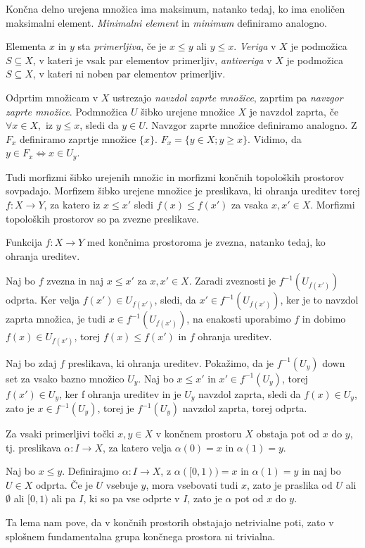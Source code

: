 \documentclass[mat1]{fmfdelo}
\begin{document}
Končna delno urejena množica ima maksimum, natanko tedaj, ko ima enoličen maksimalni element. \textit{Minimalni element} in \textit{minimum} definiramo analogno.

Elementa $x$ in $y$ sta \textit{primerljiva}, če je $x\leq y$ ali $y\leq x$. \textit{Veriga} v $X$ je podmožica $S\subseteq X$, v kateri je vsak par elementov primerljiv, \textit{antiveriga} v $X$ je podmožica $S\subseteq X$, v kateri ni noben par elementov primerljiv. 

Odprtim množicam v $X$ ustrezajo \textit{navzdol zaprte množice}, zaprtim pa \textit{navzgor zaprte množice}. Podmnožica $U$
 šibko urejene množice $X$ je navzdol zaprta, če $\forall x\in X,$ iz $y\leq x$, sledi da $y\in U$. Navzgor zaprte množice definiramo analogno.
Z $F_x$ definiramo zaprtje množice $\{x\}$. $F_x=\{y\in X; y\geq x\}$. Vidimo, da $y\in F_x \Leftrightarrow x\in U_y$.

Tudi morfizmi šibko urejenih množic in morfizmi končnih topoloških prostorov sovpadajo.
  Morfizem šibko urejene množice je preslikava, ki ohranja ureditev torej $f: X\rightarrow Y$, 
  za katero iz $x\leq x'$ sledi $f(x)\leq f(x')$ za vsaka $x,x'\in X$. Morfizmi topoloških prostorov so pa zvezne preslikave.

\begin{trditev}
Funkcija $f:X\rightarrow Y$ med končnima prostoroma je zvezna, natanko tedaj, ko ohranja ureditev.
\end{trditev}

\begin{dokaz}
    Naj bo $f$ zvezna in naj $x\leq x'$ za $x, x' \in X$. Zaradi zveznosti je $f^{-1}(U_{f(x')})$ odprta. Ker velja $f(x')\in U_{f(x')}$, sledi, da $x'\in f^{-1}(U_{f(x')})$, ker je to navzdol zaprta množica, je tudi $x\in f^{-1}(U_{f(x')})$, na enakosti uporabimo $f$ in dobimo $f(x)\in U_{f(x')}$, torej $f(x)\leq f(x')$ in $f$ ohranja ureditev.

    Naj bo zdaj $f$ preslikava, ki ohranja ureditev. Pokažimo, da je $f^{-1}(U_y)$ down set za vsako bazno množico $U_y$. Naj bo $x\leq x'$ in $x'\in f^{-1}(U_y)$, torej $f(x') \in U_y$, ker f ohranja ureditev in je $U_y$ navzdol zaprta, sledi da $f(x)\in U_y$, zato je $x\in f^{-1}(U_y)$, torej je $f^{-1}(U_y)$ navzdol zaprta, torej odprta.


\end{dokaz}


\begin{lema}\label{lem:pot}
    Za vsaki primerljivi točki $x,y\in X$ v končnem prostoru $X$ obstaja pot od $x$ do $y$, tj. preslikava $\alpha: I \rightarrow X$, za katero velja $\alpha(0)=x$ in $\alpha(1)=y$.

\end{lema}
\begin{dokaz}
    Naj bo $x \leq y$. Definirajmo $\alpha:I\rightarrow X$, z $\alpha([0,1))=x$ in $\alpha(1)=y$ in naj bo $U\in X$ odprta. Če je $U$ vsebuje $y$, mora vsebovati tudi $x$, 
    zato je praslika od $U$ ali $\emptyset$ ali $[0,1)$ ali pa $I$, ki so pa vse odprte v $I$, zato je $\alpha$ pot od $x$ do $y$.
\end{dokaz}
Ta lema nam pove, da v končnih prostorih obstajajo netrivialne poti, zato v splošnem fundamentalna grupa končnega prostora ni trivialna.
\end{document}

